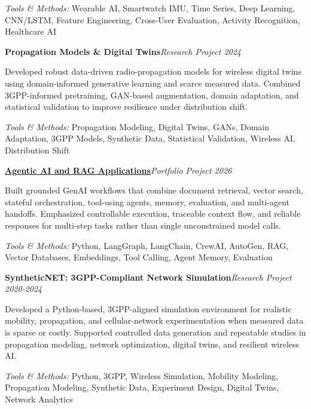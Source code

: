 \documentclass[9pt,letterpaper]{extarticle}
\newcommand{\entry}[2]{\Needspace{4\baselineskip}\textbf{#1}\hfill\textit{#2}\par}
\begin{document}
{\small\textit{Tools \& Methods:} Wearable AI, Smartwatch IMU, Time Series, Deep Learning, CNN/LSTM, Feature Engineering, Cross-User Evaluation, Activity Recognition, Healthcare AI\par}
\vspace{1pt}
\entry{Propagation Models \& Digital Twins}{Research Project \textbar{} 2024}
Developed robust data-driven radio-propagation models for wireless digital twins using domain-informed generative learning and scarce measured data. Combined 3GPP-informed pretraining, GAN-based augmentation, domain adaptation, and statistical validation to improve resilience under distribution shift.\par
{\small\textit{Tools \& Methods:} Propagation Modeling, Digital Twins, GANs, Domain Adaptation, 3GPP Models, Synthetic Data, Statistical Validation, Wireless AI, Distribution Shift\par}
\vspace{1pt}
\entry{\href{https://github.com/WaseemRaza844/agentic-ai-projects-by-was}{Agentic AI and RAG Applications}}{Portfolio Project \textbar{} 2026}
Built grounded GenAI workflows that combine document retrieval, vector search, stateful orchestration, tool-using agents, memory, evaluation, and multi-agent handoffs. Emphasized controllable execution, traceable context flow, and reliable responses for multi-step tasks rather than single unconstrained model calls.\par
{\small\textit{Tools \& Methods:} Python, LangGraph, LangChain, CrewAI, AutoGen, RAG, Vector Databases, Embeddings, Tool Calling, Agent Memory, Evaluation\par}
\vspace{1pt}
\entry{SyntheticNET: 3GPP-Compliant Network Simulation}{Research Project \textbar{} 2020-2024}
Developed a Python-based, 3GPP-aligned simulation environment for realistic mobility, propagation, and cellular-network experimentation when measured data is sparse or costly. Supported controlled data generation and repeatable studies in propagation modeling, network optimization, digital twins, and resilient wireless AI.\par
{\small\textit{Tools \& Methods:} Python, 3GPP, Wireless Simulation, Mobility Modeling, Propagation Modeling, Synthetic Data, Experiment Design, Digital Twins, Network Analytics\par}
\vspace{1pt}
\end{document}
